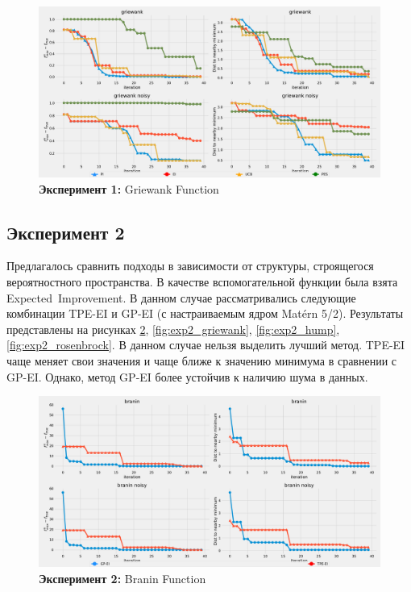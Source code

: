 \documentclass[12pt,fleqn]{article}
\begin{document}
	\begin{figure}[!h]
		\includegraphics[scale=0.25,center]{../code/exp1/griewank.pdf}
		\caption{\textbf{Эксперимент 1:} Griewank Function}
		\label{fig:exp1_griewank}
	\end{figure}
	

	
	\newpage
	\subsection{Эксперимент 2}
	Предлагалось сравнить подходы в зависимости от структуры, строящегося вероятностного пространства. В качестве вспомогательной функции была взята Expected~Improvement. В данном случае рассматривались следующие комбинации TPE-EI и GP-EI (с настраиваемым ядром  Matérn 5/2). Результаты представлены на рисунках \ref{fig:exp2_branin}, \ref{fig:exp2_griewank}, \ref{fig:exp2_hump}, \ref{fig:exp2_rosenbrock}. 
	В данном случае нельзя выделить лучший метод. TPE-EI чаще меняет свои значения и чаще ближе к значению минимума в сравнении с GP-EI. Однако, метод GP-EI более устойчив к наличию шума в данных.

	\begin{figure}[!h]
		\includegraphics[scale=0.25,center]{../code/exp2/branin.pdf}
		\caption{\textbf{Эксперимент 2:} Branin Function}
		\label{fig:exp2_branin}
	\end{figure}
	
\end{document}
